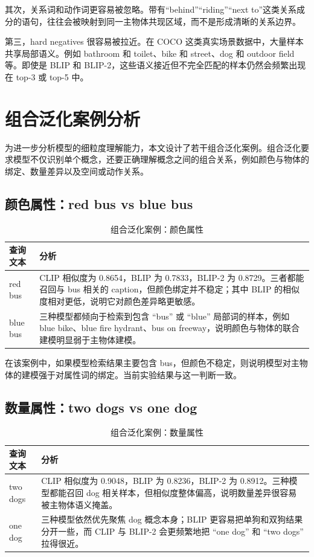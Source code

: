 \documentclass[UTF8,a4paper,10pt]{ctexart}
\begin{document}
其次，关系词和动作词更容易被忽略。带有“behind”“riding”“next to”这类关系成分的语句，往往会被映射到同一主物体共现区域，而不是形成清晰的关系边界。

第三，hard negatives 很容易被拉近。在 COCO 这类真实场景数据中，大量样本共享局部语义。例如 bathroom 和 toilet、bike 和 street、dog 和 outdoor field 等。即使是 BLIP 和 BLIP-2，这些语义接近但不完全匹配的样本仍然会频繁出现在 top-3 或 top-5 中。

\section{组合泛化案例分析}

为进一步分析模型的细粒度理解能力，本文设计了若干组合泛化案例。组合泛化要求模型不仅识别单个概念，还要正确理解概念之间的组合关系，例如颜色与物体的绑定、数量差异以及空间或动作关系。

\subsection{颜色属性：red bus vs blue bus}

\begin{table}[H]
    \centering
    \caption{组合泛化案例：颜色属性}
    \begin{tabular}{p{4cm}p{10cm}}
        \toprule
        查询文本 & 分析 \\
        \midrule
        red bus & CLIP 相似度为 0.8654，BLIP 为 0.7833，BLIP-2 为 0.8729。三者都能召回与 bus 相关的 caption，但颜色绑定并不稳定；其中 BLIP 的相似度相对更低，说明它对颜色差异略更敏感。 \\
        blue bus & 三种模型都倾向于检索到包含 ``bus'' 或 ``blue'' 局部词的样本，例如 blue bike、blue fire hydrant、bus on freeway，说明颜色与物体的联合建模明显弱于主物体建模。 \\
        \bottomrule
    \end{tabular}
\end{table}

在该案例中，如果模型检索结果主要包含 bus，但颜色不稳定，则说明模型对主物体的建模强于对属性词的绑定。当前实验结果与这一判断一致。

\subsection{数量属性：two dogs vs one dog}

\begin{table}[H]
    \centering
    \caption{组合泛化案例：数量属性}
    \begin{tabular}{p{4cm}p{10cm}}
        \toprule
        查询文本 & 分析 \\
        \midrule
        two dogs & CLIP 相似度为 0.9048，BLIP 为 0.8236，BLIP-2 为 0.8912。三种模型都能召回 dog 相关样本，但相似度整体偏高，说明数量差异很容易被主物体语义掩盖。 \\
        one dog & 三种模型依然优先聚焦 dog 概念本身；BLIP 更容易把单狗和双狗结果分开一些，而 CLIP 与 BLIP-2 会更频繁地把 ``one dog'' 和 ``two dogs'' 拉得很近。 \\
        \bottomrule
    \end{tabular}
\end{table}
\end{document}

